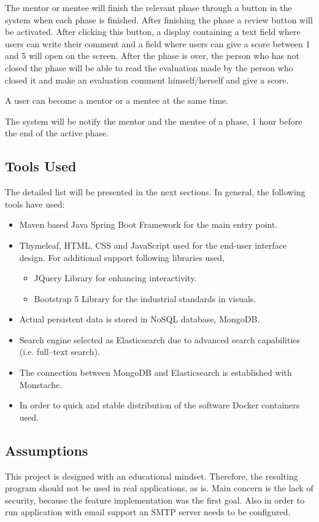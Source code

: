 \documentclass[10pt]{article}
\begin{document}
The mentor or mentee will finish the relevant phase through a button in the system when
each phase is finished. After finishing the phase a review button will be activated.
After clicking this button, a display containing a text field where users can write their
comment and a field where users can give a score between 1 and 5 will open on the screen.
After the phase is over, the person who has not closed the phase will be able to read the
evaluation made by the person who closed it and make an evaluation comment himself/herself
and give a score.

A user can become a mentor or a mentee at the same time.

The system will be notify the mentor and the mentee of a phase, 1 hour before the end
of the active phase.


\subsection{Tools Used} \label{tools_used}
The detailed list will be presented in the next sections. In general, the following tools
have used:
\begin{itemize}
    \item Maven based Java Spring Boot Framework for the main entry point.
    \item Thymeleaf, HTML, CSS and JavaScript used for the end-user interface design.
    For additional support following libraries used,
    \begin{itemize}
        \item JQuery Library for enhancing interactivity.
        \item Bootstrap 5 Library for the industrial standards in visuals.
    \end{itemize}
    \item Actual persistent data is stored in NoSQL database, MongoDB.
    \item Search engine selected as Elasticsearch due to advanced search capabilities
    (i.e. full--text search).
    \item The connection between MongoDB and Elasticsearch is established with Monstache.
    \item In order to quick and stable distribution of the software Docker containers used.
\end{itemize}


\subsection{Assumptions} \label{assumptions}
This project is designed with an educational mindset. Therefore, the resulting program
should not be used in real applications, as is. Main concern is the lack of security,
because the feature implementation was the first goal. Also in order to run application
with email support an SMTP server needs to be configured.
\end{document}
